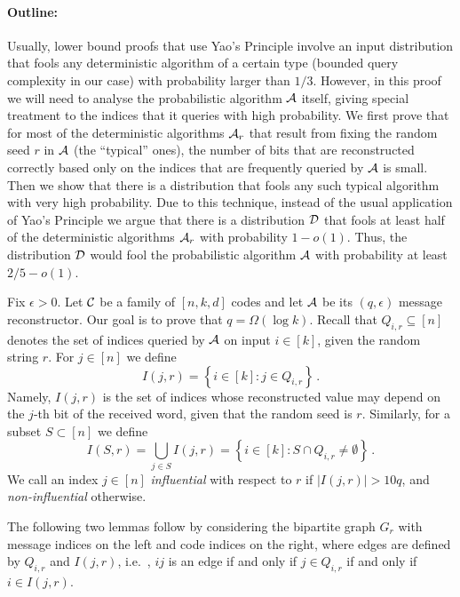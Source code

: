 \documentclass[10pt]{article}
\theoremstyle{definition}
\providecommand{\ie}{i.e.\ }
\numberwithin{equation}{section}
\newcommand{\ALG}{{\cal A}}
\newcommand{\DD}{{\cal D}}
\newcommand{\CC}{{\cal C}}
\begin{document}
\paragraph{Outline:} Usually, lower bound proofs that use Yao's Principle involve an input distribution that fools any deterministic algorithm of a certain type (bounded query complexity in our case) with probability larger than $1/3$. However, in this proof we will need to analyse the probabilistic algorithm $\ALG$ itself, giving special treatment to the indices that it queries with high probability.
We first prove that for most of the deterministic algorithms $\ALG_r$ that result from fixing the random seed $r$ in $\ALG$ (the ``typical'' ones), the number of bits
that are reconstructed correctly based only on the indices that are frequently queried by $\ALG$ is small. Then we show that there is a distribution that fools any such typical algorithm with very high probability. Due to this technique, instead of the usual application of Yao's Principle we argue that there is a distribution $\DD$ that fools at least half of the deterministic algorithms $\ALG_r$ with probability $1-o(1)$. Thus, the distribution $\DD$ would fool the probabilistic algorithm $\ALG$ with probability at least $2/5-o(1)$.
%

%

%

%
%
%

Fix $\epsilon > 0$. Let $\CC$ be a family of $[n,k,d]$ codes and let $\ALG$ be its $(q,\epsilon)$ message reconstructor. Our goal is to prove that $q=\Omega(\log k)$.
Recall that $Q_{i,r} \subseteq [n]$ denotes the set of indices queried
by $\ALG$ on input $i \in [k]$, given the random string $r$. For $j\in
[n]$ we define
\[
I(j, r) = \left\{ i\in [k] : j \in Q_{i, r}\right\}\,.
\]
Namely,
 $I(j, r)$ is the set of indices whose reconstructed value
may depend on the 
%
$j$-th 
bit of the received word, given that the random seed is $r$.
Similarly, for a subset $S\subset [n]$ we define
\[
I(S,r) = \bigcup_{j \in S}I(j,r)= \left\{ i\in [k] : S\cap Q_{i, r}\neq
\emptyset\right\}\,.
\]
We call an index $j \in [n]$
 \emph{influential} with respect to $r$ if $|I(j,r)| > 10 q$, and \emph{non-influential} otherwise.

The following two lemmas follow by considering the bipartite graph $G_r$ with message indices on the left and code indices on the right, where edges are defined by $Q_{i,r}$ and $I(j,r)$, \ie, $ij$ is an edge if and only if $j \in Q_{i,r}$ if and only if  $i \in I(j,r)$.
\end{document}
